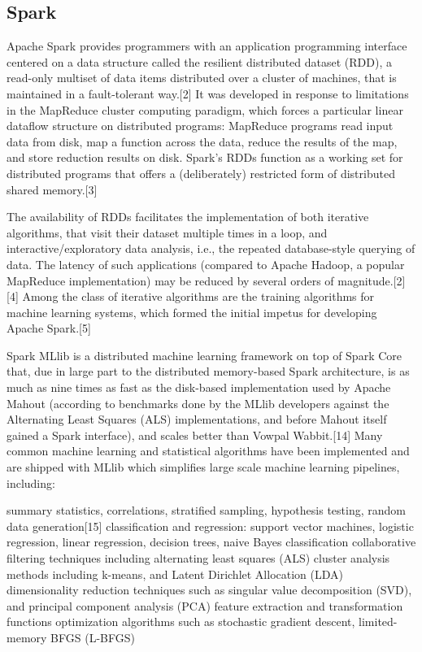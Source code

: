 \subsection{Spark}

Apache Spark provides programmers with an application programming interface centered on a data structure called the resilient distributed dataset (RDD), a read-only multiset of data items distributed over a cluster of machines, that is maintained in a fault-tolerant way.[2] It was developed in response to limitations in the MapReduce cluster computing paradigm, which forces a particular linear dataflow structure on distributed programs: MapReduce programs read input data from disk, map a function across the data, reduce the results of the map, and store reduction results on disk. Spark's RDDs function as a working set for distributed programs that offers a (deliberately) restricted form of distributed shared memory.[3]

The availability of RDDs facilitates the implementation of both iterative algorithms, that visit their dataset multiple times in a loop, and interactive/exploratory data analysis, i.e., the repeated database-style querying of data. The latency of such applications (compared to Apache Hadoop, a popular MapReduce implementation) may be reduced by several orders of magnitude.[2][4] Among the class of iterative algorithms are the training algorithms for machine learning systems, which formed the initial impetus for developing Apache Spark.[5]

Spark MLlib is a distributed machine learning framework on top of Spark Core that, due in large part to the distributed memory-based Spark architecture, is as much as nine times as fast as the disk-based implementation used by Apache Mahout (according to benchmarks done by the MLlib developers against the Alternating Least Squares (ALS) implementations, and before Mahout itself gained a Spark interface), and scales better than Vowpal Wabbit.[14] Many common machine learning and statistical algorithms have been implemented and are shipped with MLlib which simplifies large scale machine learning pipelines, including:

summary statistics, correlations, stratified sampling, hypothesis testing, random data generation[15]
classification and regression: support vector machines, logistic regression, linear regression, decision trees, naive Bayes classification
collaborative filtering techniques including alternating least squares (ALS)
cluster analysis methods including k-means, and Latent Dirichlet Allocation (LDA)
dimensionality reduction techniques such as singular value decomposition (SVD), and principal component analysis (PCA)
feature extraction and transformation functions
optimization algorithms such as stochastic gradient descent, limited-memory BFGS (L-BFGS)

